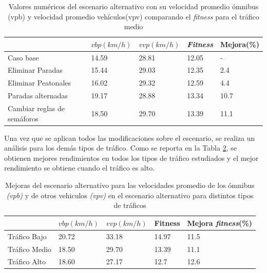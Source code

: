 \begin{table}[H]
	\renewcommand{\arraystretch}{1.2}
	\caption[Valores numéricos del escenario alternativo]{Valores numéricos del escenario alternativo con su velocidad promedio ómnibus (vpb) y velocidad promedio vehículos(vpv) comparando el \emph{fitness} para el tráfico medio }
	\label{table:resultado_alternativo}
	\centering
	\begin{tabular}{p{3.5cm}p{2.5cm}p{2.5cm}p{2cm}p{2cm} }
		\hline
		&
		$vbp(km/h)$& 
		$vvp(km/h)$ & 
		\emph{Fitness} &
		Mejora(\%)
		\\ 
		\hline
		Caso base & 14.59  & 28.81& 12.05 & -\\
		Eliminar Paradas & 15.44  & 29.03& 12.35 & 2.4\\
		Eliminar Peatonales  & 16.02  & 29.32& 12.59 & 4.4\\
		Paradas alternadas  & 19.17  & 28.88& 13.34 & 10.7\\	
		Cambiar reglas de semáforos  & 18.50  & 29.70& 13.39 & 11.1\\				
		\hline
	\end{tabular}
\end{table}

Una vez que se aplican todos las modificaciones sobre el escenario, se realiza un análisis para los demás tipos de tráfico. Como se reporta en la Tabla \ref{table:mejoras_trafico_alternativo}, se obtienen mejores rendimientos en todos los tipos de tráfico estudiados y el mejor rendimiento se obtiene cuando el tráfico es alto. 

\begin{table}[H]
	\renewcommand{\arraystretch}{1.2}
	\caption[Mejoras del escenario alternativo.]{Mejoras del escenario alternativo  para las velocidades promedio de los ómnibus \textit{(vpb)} y de otros vehiculos \textit{(vpv)} en el escenario alternativo para distintos tipos de tráficos }
	\label{table:mejoras_trafico_alternativo}
	\centering
	\begin{tabular}{p{3.5cm}p{2.5cm}p{2.5cm}p{2cm}p{2cm} }
		\hline
		&
		$vbp(km/h)$& 
		$vvp(km/h)$ & 
		Fitness &
		Mejora \emph{fitness}(\%)
		\\ 
		\hline

		Tráfico Bajo & 20.72  & 33.18 & 14.97 & 11.5\\
		Tráfico Medio & 18.50  & 29.70& 13.39 & 11.1 \\
		Tráfico Alto  & 18.60  & 27.17& 12.7 & 12.6\\		
		\hline
	\end{tabular}
\end{table}

